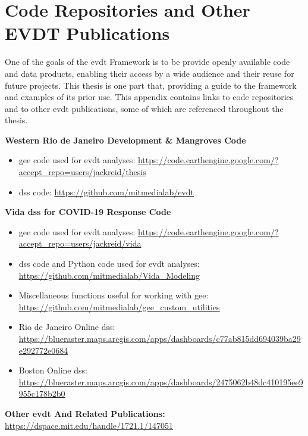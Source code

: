 \chapter{Code Repositories and Other EVDT Publications} \label{app:code}

One of the goals of the \ac{evdt} Framework is to be provide openly available code and data products, enabling their access by a wide audience and their reuse for future projects. This thesis is one part that, providing a guide to the framework and examples of its prior use. This appendix contains links to code repositories and to other \ac{evdt} publications, some of which are referenced throughout the thesis.

\textbf{Western Rio de Janeiro Development \& Mangroves Code}

\begin{itemize}[itemsep=0pt,parsep=0pt]
	\item{\ac{gee} code used for \ac{evdt} analyses: \url{https://code.earthengine.google.com/?accept_repo=users/jackreid/thesis}}
	\item{\ac{dss} code: \url{https://github.com/mitmedialab/evdt}}
\end{itemize}


\textbf{Vida \ac{dss} for COVID-19 Response Code}

\begin{itemize}[itemsep=0pt,parsep=0pt]
	\item{\ac{gee} code used for \ac{evdt} analyses: \url{https://code.earthengine.google.com/?accept_repo=users/jackreid/vida}}
	\item{\ac{dss} code and Python code used for \ac{evdt} analyses: \url{https://github.com/mitmedialab/Vida_Modeling}}
	\item{Miscellaneous functions useful for working with \ac{gee}: \url{https://github.com/mitmedialab/gee_custom_utilities}}
	\item{Rio de Janeiro Online \ac{dss}: \url{https://blueraster.maps.arcgis.com/apps/dashboards/c77ab815dd694039ba29e292772e0684}}
	\item{Boston Online \ac{dss}: \url{https://blueraster.maps.arcgis.com/apps/dashboards/2475062b48dc410195ee9955c178b2b0}}
\end{itemize}

\textbf{Other \ac{evdt} And Related Publications:} \url{https://dspace.mit.edu/handle/1721.1/147051}
